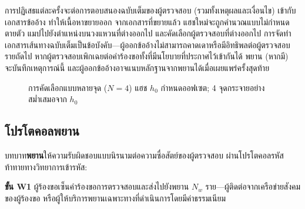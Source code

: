 \documentclass[11pt,a4paper,twocolumn]{article}
\begin{document}
การปฏิเสธแต่ละครั้งจะต่อการตอบสนองฉบับเต็มของผู้ตรวจสอบ (รวมทั้งเหตุผลและเงื่อนไข) เข้ากับเอกสารข้ออ้าง ทำให้เนื้อหาขยายออก จากเอกสารที่ขยายแล้ว แฮชใหม่จะถูกคำนวณแบบไม่กำหนดตายตัว แมปไปยังตำแหน่งบนวงแหวนที่ต่างออกไป และคัดเลือกผู้ตรวจสอบที่ต่างออกไป การจัดทำเอกสารเส้นทางฉบับเต็มเป็นข้อบังคับ---ผู้ออกข้ออ้างไม่สามารถคาดเดาหรือมีอิทธิพลต่อผู้ตรวจสอบรายถัดไป หากผู้ตรวจสอบเพิกเฉยต่อคำร้องขอทั้งที่มีนโยบายที่ประกาศไว้เข้ากันได้ พยาน (หากมี) จะบันทึกเหตุการณ์นี้ และผู้ออกข้ออ้างอาจแนบหลักฐานจากพยานได้เมื่อเผยแพร่ครั้งสุดท้าย

\begin{figure}[ht]
\centering
{}
\caption{การคัดเลือกแบบหลายจุด ($N{=}4$) แฮช $h_0$ กำหนดออฟเซต; 4 จุดกระจายอย่างสม่ำเสมอจาก $h_0$}
\label{fig:multipoint}
\end{figure}

\subsection{โปรโตคอลพยาน}

บทบาท\textbf{พยาน}ให้ความรับผิดชอบแบบนิรนามต่อความซื่อสัตย์ของผู้ตรวจสอบ ผ่านโปรโตคอลรหัสท้าทายทางวิทยาการเข้ารหัส:

\textbf{ขั้น W1} ผู้ร้องขอเซ็นคำร้องขอการตรวจสอบและส่งไปยังพยาน $N_w$ ราย---ผู้ติดต่อจากเครือข่ายสังคมของผู้ร้องขอ หรือผู้ให้บริการพยานเฉพาะทางที่ดำเนินการโดยมีค่าธรรมเนียม
\end{document}
